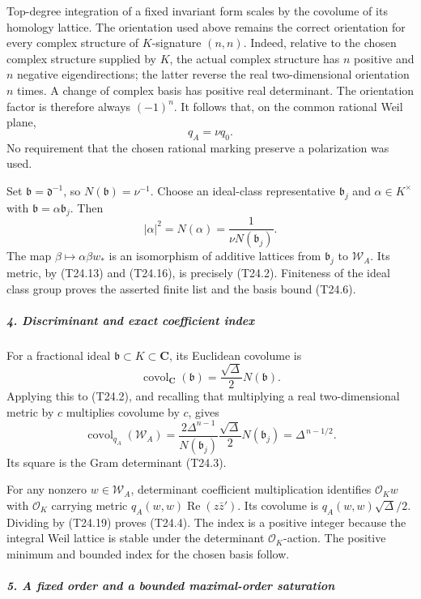 Top-degree integration of a fixed invariant form scales by the covolume of its homology lattice. The orientation used above remains the correct orientation for every complex structure of \(K\)-signature \((n,n)\). Indeed, relative to the chosen complex structure supplied by \(K\), the actual complex structure has \(n\) positive and \(n\) negative eigendirections; the latter reverse the real two-dimensional orientation \(n\) times. A change of complex basis has positive real determinant. The orientation factor is therefore always \((-1)^n\). It follows that, on the common rational Weil plane, \[
 q_A=\nu q_0.
 \tag{T24.16}
\] No requirement that the chosen rational marking preserve a polarization was used.

Set \(\mathfrak b=\mathfrak d^{-1}\), so \(N(\mathfrak b)=\nu^{-1}\). Choose an ideal-class representative \(\mathfrak b_j\) and \(\alpha\in K^\times\) with \(\mathfrak b=\alpha\mathfrak b_j\). Then \[
 |\alpha|^2=N(\alpha)=\frac{1}{\nu N(\mathfrak b_j)}.
 \tag{T24.17}
\] The map \(\beta\mapsto\alpha\beta w_*\) is an isomorphism of additive lattices from \(\mathfrak b_j\) to \(\mathscr W_A\). Its metric, by (T24.13) and (T24.16), is precisely (T24.2). Finiteness of the ideal class group proves the asserted finite list and the basis bound (T24.6).

\subparagraph{4. Discriminant and exact coefficient index}\label{discriminant-and-exact-coefficient-index}

For a fractional ideal \(\mathfrak b\subset K\subset\mathbf C\), its Euclidean covolume is \[
 \operatorname{covol}_{\mathbf C}(\mathfrak b)
       =\frac{\sqrt\Delta}{2}N(\mathfrak b).
 \tag{T24.18}
\] Applying this to (T24.2), and recalling that multiplying a real two-dimensional metric by \(c\) multiplies covolume by \(c\), gives \[
 \operatorname{covol}_{q_A}(\mathscr W_A)
      =\frac{2\Delta^{n-1}}{N(\mathfrak b_j)}
          \frac{\sqrt\Delta}{2}N(\mathfrak b_j)
      =\Delta^{\,n-1/2}.
 \tag{T24.19}
\] Its square is the Gram determinant (T24.3).

For any nonzero \(w\in\mathscr W_A\), determinant coefficient multiplication identifies \(\mathcal O_Kw\) with \(\mathcal O_K\) carrying metric \(q_A(w,w)\operatorname{Re}(z\bar z')\). Its covolume is \(q_A(w,w)\sqrt\Delta/2\). Dividing by (T24.19) proves (T24.4). The index is a positive integer because the integral Weil lattice is stable under the determinant \(\mathcal O_K\)-action. The positive minimum and bounded index for the chosen basis follow.

\subparagraph{5. A fixed order and a bounded maximal-order saturation}\label{a-fixed-order-and-a-bounded-maximal-order-saturation}


